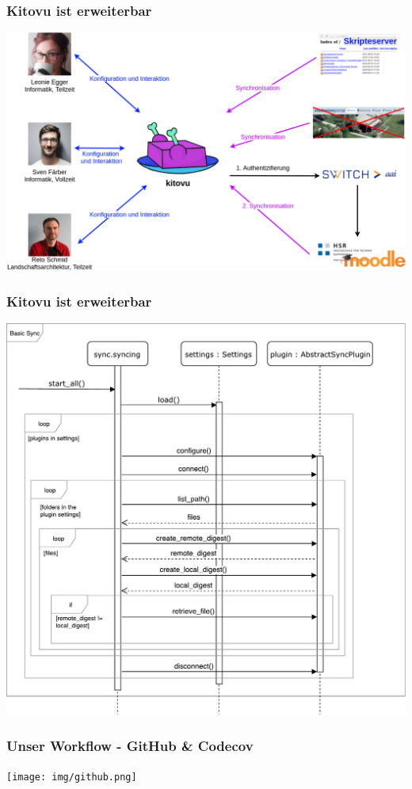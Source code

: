 \documentclass{beamer}
\begin{document}
	\begin{frame}
	\frametitle{Kitovu ist erweiterbar}
	\includegraphics[width=\linewidth]{../03_End_of_Elaboration/img/kontextdiagramm.png}
	\end{frame}
	
	\begin{frame}
	\frametitle{Kitovu ist erweiterbar}
	\includegraphics[height=0.9\textheight]{../03_End_of_Elaboration/img/GrobesSequenzDiagramm.pdf}
	\end{frame}
	
	\begin{frame}
	\frametitle{Unser Workflow - GitHub \& Codecov}
	\texttt{[image: img/github.png]}
	\end{frame}
\end{document}
